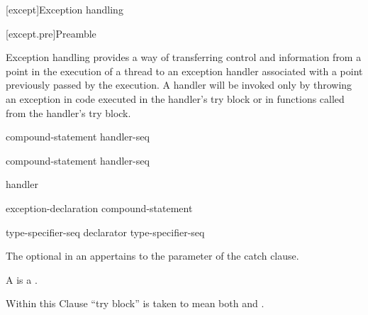 [except]{Exception handling}%


%

[except.pre]{Preamble}

\pnum
Exception handling provides a way of transferring control and information
from a point in the execution of a thread to an exception handler
associated with a point previously passed by the execution.
A handler will be invoked only by throwing an exception
in code executed in the handler's try block
or in functions called from the handler's try block.

%
%
\begin{bnf}
\br
     compound-statement handler-seq
\end{bnf}

%
%
\begin{bnf}
\br
      compound-statement handler-seq
\end{bnf}

\begin{bnf}
\br
    handler 
\end{bnf}

%
%
\begin{bnf}
\br
     \terminal{(} exception-declaration \terminal{)} compound-statement
\end{bnf}

\begin{bnf}
\br
     type-specifier-seq declarator\br
     type-specifier-seq \br
\end{bnf}

The optional  in an 
appertains to the parameter of the catch clause.

\pnum
{}%
%
%
%
A  is a .
\begin{note}
Within this Clause
``try block'' is taken to mean both  and
.
\end{note}


